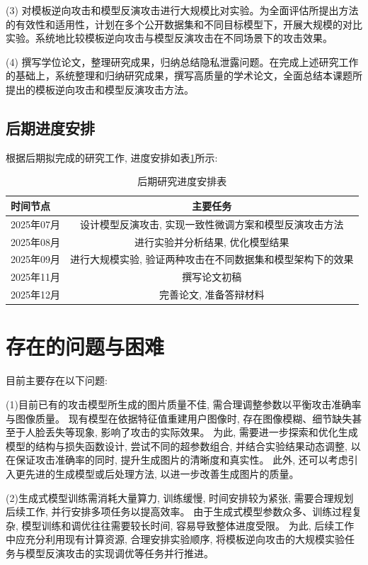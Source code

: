 (3) 对模板逆向攻击和模型反演攻击进行大规模比对实验。为全面评估所提出方法的有效性和适用性，计划在多个公开数据集和不同目标模型下，开展大规模的对比实验。系统地比较模板逆向攻击与模型反演攻击在不同场景下的攻击效果。

(4) 撰写学位论文，整理研究成果，归纳总结隐私泄露问题。在完成上述研究工作的基础上，系统整理和归纳研究成果，撰写高质量的学术论文，全面总结本课题所提出的模板逆向攻击和模型反演攻击方法。


\subsection{后期进度安排}

根据后期拟完成的研究工作, 进度安排如表\ref{tab:progress_schedule}所示:
\begin{table}[H]
  \centering
  \begin{tabular}{lc}
    \hline
    时间节点     & 主要任务                           \\
    \hline
    2025年07月 & 设计模型反演攻击, 实现一致性微调方案和模型反演攻击方法   \\
    \hline
    2025年08月 & 进行实验并分析结果, 优化模型结果              \\
    \hline
    2025年09月 & 进行大规模实验, 验证两种攻击在不同数据集和模型架构下的效果 \\
    \hline
    2025年11月 & 撰写论文初稿                         \\
    \hline
    2025年12月 & 完善论文, 准备答辩材料                   \\
    \hline
  \end{tabular}
  \caption{后期研究进度安排表}
  \label{tab:progress_schedule}
\end{table}

\section{存在的问题与困难}
目前主要存在以下问题:

(1)目前已有的攻击模型所生成的图片质量不佳, 需合理调整参数以平衡攻击准确率与图像质量。
现有模型在依据特征值重建用户图像时, 存在图像模糊、细节缺失甚至于人脸丢失等现象, 影响了攻击的实际效果。
为此, 需要进一步探索和优化生成模型的结构与损失函数设计, 尝试不同的超参数组合, 并结合实验结果动态调整, 以在保证攻击准确率的同时, 提升生成图片的清晰度和真实性。
此外, 还可以考虑引入更先进的生成模型或后处理方法, 以进一步改善生成图片的质量。

(2)生成式模型训练需消耗大量算力, 训练缓慢, 时间安排较为紧张, 需要合理规划后续工作, 并行安排多项任务以提高效率。
由于生成式模型参数众多、训练过程复杂, 模型训练和调优往往需要较长时间, 容易导致整体进度受限。
为此, 后续工作中应充分利用现有计算资源, 合理安排实验顺序, 将模板逆向攻击的大规模实验任务与模型反演攻击的实现调优等任务并行推进。

